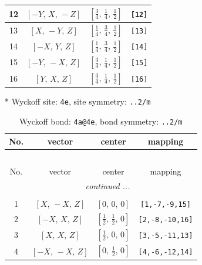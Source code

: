 \documentclass[fleqn,8pt]{jsarticle}
\begin{document}
\begin{longtable}{cccc}
12 & $\left[ - Y,\, X,\, - Z \right]$ & $\left[ \frac{3}{4},\, \frac{1}{4},\, \frac{1}{2} \right]$ & {\tt [12]} \\ \hline
13 & $\left[ X,\, - Y,\, Z \right]$ & $\left[ \frac{1}{4},\, \frac{3}{4},\, \frac{1}{2} \right]$ & {\tt [13]} \\ \hline
14 & $\left[ - X,\, Y,\, Z \right]$ & $\left[ \frac{1}{4},\, \frac{3}{4},\, \frac{1}{2} \right]$ & {\tt [14]} \\ \hline
15 & $\left[ - Y,\, - X,\, Z \right]$ & $\left[ \frac{3}{4},\, \frac{1}{4},\, \frac{1}{2} \right]$ & {\tt [15]} \\ \hline
16 & $\left[ Y,\, X,\, Z \right]$ & $\left[ \frac{3}{4},\, \frac{1}{4},\, \frac{1}{2} \right]$ & {\tt [16]} \\
\end{longtable}
* Wyckoff site: {\tt 4e}, site symmetry: {\tt ..2/m}
\renewcommand{\arraystretch}{1.2}
\begin{longtable}{cccc}
\caption{Wyckoff bond: {\tt 4a@4e}, bond symmetry: {\tt ..2/m}}
 \\
 \hline \hline
No. & vector & center & mapping \\ \hline \endfirsthead

\multicolumn{3}{l}{\tablename\ \thetable{}} \\
 \hline \hline
No. & vector & center & mapping \\ \hline \endhead

 \hline \hline
\multicolumn{3}{r}{\footnotesize\it continued ...} \\ \endfoot

 \hline \hline
\multicolumn{3}{r}{} \\ \endlastfoot

1 & $\left[ X,\, - X,\, Z \right]$ & $\left[ 0,\, 0,\, 0 \right]$ & {\tt [1,-7,-9,15]} \\ \hline
2 & $\left[ - X,\, X,\, Z \right]$ & $\left[ \frac{1}{2},\, \frac{1}{2},\, 0 \right]$ & {\tt [2,-8,-10,16]} \\ \hline
3 & $\left[ X,\, X,\, Z \right]$ & $\left[ \frac{1}{2},\, 0,\, 0 \right]$ & {\tt [3,-5,-11,13]} \\ \hline
4 & $\left[ - X,\, - X,\, Z \right]$ & $\left[ 0,\, \frac{1}{2},\, 0 \right]$ & {\tt [4,-6,-12,14]} \\
\end{longtable}
\renewcommand{\arraystretch}{1.2}
\end{document}

